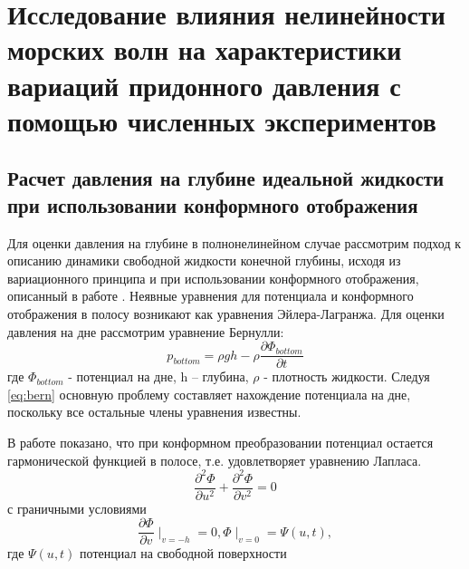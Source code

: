 \section{Исследование влияния нелинейности морских волн на характеристики вариаций придонного давления с помощью численных экспериментов} \label{sect3_2}
\subsection{Расчет давления на глубине идеальной жидкости при использовании конформного отображения}
Для оценки давления на глубине в полнонелинейном случае рассмотрим подход к описанию динамики свободной жидкости конечной глубины, исходя из вариационного принципа и при использовании конформного отображения, описанный в работе \cite{DiachZK1996}. Неявные уравнения для потенциала и конформного отображения в полосу возникают как уравнения Эйлера-Лагранжа.
Для оценки давления на дне рассмотрим уравнение Бернулли:
\begin{equation}\label{eq:bern}
p_{bottom}=\rho gh-\rho \frac{\partial\Phi_{bottom}}{\partial t}
\end{equation}
где  $\Phi_{bottom}$ - потенциал на дне, h – глубина, $\rho$ - плотность жидкости. Следуя \eqref{eq:bern} основную проблему составляет нахождение потенциала на дне, поскольку все остальные члены уравнения известны.

В работе \cite{DiachZK1996} показано, что при конформном преобразовании потенциал   остается гармонической функцией в полосе, т.е. удовлетворяет уравнению Лапласа.
\begin{equation}\label{eq:laplas}
\frac{\partial^2\Phi}{\partial u^2}+\frac{\partial^2\Phi}{\partial v^2} = 0
\end{equation}
с граничными условиями
\begin{equation}\label{eq:laplasGranUsl}
\frac{\partial\Phi}{\partial v}\mid_{v=-h}=0, \Phi\mid_{v=0}=\Psi(u,t),
\end{equation}
где $\Psi(u,t)$ потенциал на свободной поверхности

